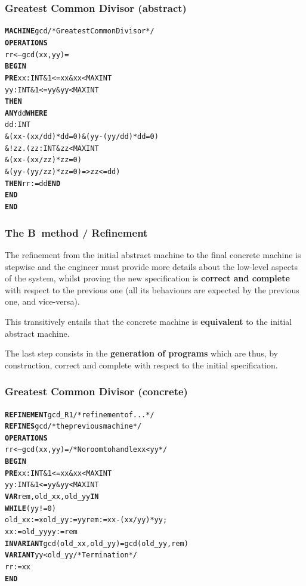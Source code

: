 \documentclass[compress,dvipdfmx]{beamer}
\begin{document}
\begin{frame}[fragile]
  \frametitle{Greatest Common Divisor (abstract)}

\begin{alltt}
\small
\textbf{MACHINE} gcd /* Greatest Common Divisor */
\textbf{OPERATIONS}
  rr <-- gcd (xx,yy) =
    \textbf{BEGIN}
      \textbf{PRE} xx : INT \& 1 <= xx \& xx < MAXINT
          yy : INT \& 1 <= yy \& yy < MAXINT
      \textbf{THEN}
        \textbf{ANY} dd \textbf{WHERE}
         dd : INT
            \& (xx-(xx/dd)*dd = 0) \& (yy-(yy/dd)*dd = 0)
            \& !zz.(zz : INT \& zz < MAXINT
                   \& (xx-(xx/zz)*zz = 0)
                   \& (yy-(yy/zz)*zz = 0) => zz <= dd)
        \textbf{THEN} rr := dd \textbf{END}
      \textbf{END}
    \textbf{END}
\end{alltt}

\end{frame}


\begin{frame}
  \frametitle{The B~method / Refinement}

  The refinement from the initial abstract machine to the final
  concrete machine is stepwise and the engineer must provide more
  details about the low\hyp{}level aspects of the system, whilst
  proving the new specification is \textbf{correct and complete} with
  respect to the previous one (all its behaviours are expected by the
  previous one, and vice\hyp{}versa).

  \bigskip

  This transitively entails that the concrete machine is
  \textbf{equivalent} to the initial abstract machine.

  \bigskip

  The last step consists in the \textbf{generation of \Ada programs}
  which are thus, by construction, correct and complete with respect
  to the initial specification.

\end{frame}


\begin{frame}[fragile]
  \frametitle{Greatest Common Divisor (concrete)}

\begin{alltt}
\small
\textbf{REFINEMENT} gcd_R1 /* refinement of ... */
\textbf{REFINES} gcd /* the previous machine */
\textbf{OPERATIONS}
 rr <-- gcd (xx,yy) = /* No room to handle xx < yy */
   \textbf{BEGIN}
     \textbf{PRE} xx : INT \& 1 <= xx \& xx < MAXINT
         yy : INT \& 1 <= yy \& yy < MAXINT
     \textbf{VAR} rem, old_xx, old_yy \textbf{IN}
     \textbf{WHILE} (yy != 0)
       old_xx := xold_yy := yyrem := xx-(xx/yy)*yy;
       xx := old_yyyy := rem
     \textbf{INVARIANT} gcd (old_xx, old_yy) = gcd (old_yy, rem)
     \textbf{VARIANT} yy < old_yy /* Termination */
     rr := xx
   \textbf{END}
\end{alltt}

\end{frame}
\end{document}
